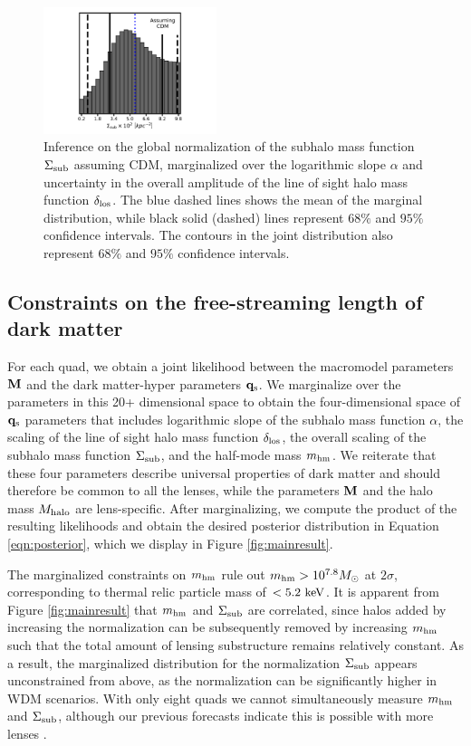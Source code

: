\begin{figure}
	\includegraphics[clip,trim=3cm 0.3cm 3cm
	0cm,width=0.45\textwidth,keepaspectratio]{./figures_wdmchillsout/CDM_joint.pdf}
	\captionsetup{width=.45\textwidth}
	\caption{\label{fig:cdmsigmasub} Inference on the global normalization of the subhalo mass function $\Sigma_{\rm{sub}}$ assuming CDM, marginalized over the logarithmic slope $\alpha$ and uncertainty in the overall amplitude of the line of sight halo mass function $\delta_{\rm{los}}$. The blue dashed lines shows the mean of the marginal distribution, while black solid (dashed) lines represent $68\%$ and $95 \%$ confidence intervals. The contours in the joint distribution also represent $68\%$ and $95 \%$ confidence intervals.}
\end{figure}	

\subsection{Constraints on the free-streaming length of dark matter}
\label{ssec:mainresults}
For each quad, we obtain a joint likelihood between the macromodel parameters ${\bf{M}}$ and the dark matter-hyper parameters ${\bf{q}_{\rm{s}}}$. We marginalize over the parameters in this 20+ dimensional space to obtain the four-dimensional space of ${\bf{q}_{\rm{s}}}$ parameters that includes logarithmic slope of the subhalo mass function $\alpha$, the scaling of the line of sight halo mass function $\delta_{\rm{los}}$, the overall scaling of the subhalo mass function $\Sigma_{\rm{sub}}$, and the half-mode mass ${m_{\rm{hm}}}$. We reiterate that these four parameters describe universal properties of dark matter and should therefore be common to all the lenses, while the parameters ${\bf{M}}$ and the halo mass $M_{\rm{halo}}$ are lens-specific. After marginalizing, we compute the product of the resulting likelihoods and obtain the desired posterior distribution in Equation \ref{eqn:posterior}, which we display in Figure \ref{fig:mainresult}.

The marginalized constraints on ${m_{\rm{hm}}}$ rule out ${m_{\rm{hm}}} > 10^{7.8} {M_{\odot}}$ at $2 \sigma$, corresponding to thermal relic particle mass of $<5.2 \ \rm{keV}$. It is apparent from Figure \ref{fig:mainresult} that ${m_{\rm{hm}}}$ and $\Sigma_{\rm{sub}}$ are correlated, since halos added by increasing the normalization can be subsequently removed by increasing ${m_{\rm{hm}}}$ such that the total amount of lensing substructure remains relatively constant. As a result, the marginalized distribution for the normalization $\Sigma_{\rm{sub}}$ appears unconstrained from above, as the normalization can be significantly higher in WDM scenarios. With only eight quads we cannot simultaneously measure ${m_{\rm{hm}}}$ and $\Sigma_{\rm{sub}}$, although our previous forecasts indicate this is possible with more lenses \cite{Gilman++18}. 

